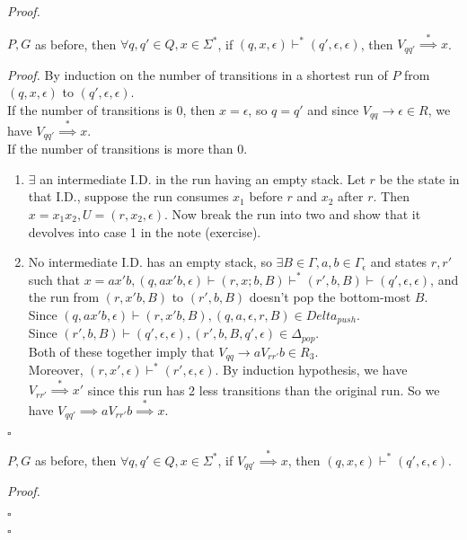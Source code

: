 \documentclass[a4paper]{article}
\newenvironment{proof}{\begin{breakbox}\textit{Proof.}}{\hfill$\square$\end{breakbox}}
\newcommand{\nl}{\vspace{0.2cm}\\}
\newcommand{\produces}{\implies}
\newcommand{\derives}{\stackrel{*}{\implies}}
\newcommand{\changesto}{\vdash}
\begin{document}
\begin{proof}
    \begin{claim}
        $P, G$ as before, then $\forall q, q' \in Q, x \in \Sigma^*$, if $(q, x, \epsilon) \changesto^* (q', \epsilon, \epsilon)$, then $V_{qq'} \derives x$.
    \end{claim}
    \begin{proof}
        By induction on the number of transitions in a shortest run of $P$ from $(q, x, \epsilon)$ to $(q', \epsilon, \epsilon)$.\nl
        If the number of transitions is $0$, then $x = \epsilon$, so $q = q'$ and since $V_{qq} \to \epsilon \in R$, we have $V_{qq'} \derives x$.\nl
        If the number of transitions is more than 0.
        \begin{enumerate}
            \item $\exists$ an intermediate I.D. in the run having an empty stack. Let $r$ be the state in that I.D., suppose the run consumes $x_1$ before $r$ and $x_2$ after $r$.
                Then $x = x_1x_2, U = (r, x_2, \epsilon)$. Now break the run into two and show that it devolves into case 1 in the note (exercise).
            \item No intermediate I.D. has an empty stack, so $\exists B \in \Gamma, a, b \in \Gamma_\epsilon$ and states $r, r'$ such that $x = ax'b, (q, ax'b, \epsilon) \changesto (r, x;b, B)
                \changesto^* (r', b, B) \changesto (q', \epsilon, \epsilon)$, and the run from $(r, x'b, B)$ to $(r', b, B)$ doesn't pop the bottom-most $B$.\nl
                Since $(q, ax'b, \epsilon) \changesto (r, x'b, B), (q, a, \epsilon, r, B) \in Delta_{push}$.\nl
                Since $(r', b, B) \changesto (q', \epsilon, \epsilon), (r', b, B, q', \epsilon) \in \Delta_{pop}$.\nl
                Both of these together imply that $V_{qq} \to aV_{rr'}b \in R_3$.\nl
                Moreover, $(r, x', \epsilon) \changesto^* (r', \epsilon, \epsilon)$.
                By induction hypothesis, we have $V_{rr'} \derives x'$ since this run has 2 less transitions than the original run.
                So we have $V_{qq'} \produces aV_{rr'}b \derives x$.
        \end{enumerate}
    \end{proof}
    \begin{claim}
        $P, G$ as before, then $\forall q, q' \in Q, x \in \Sigma^*$, if $V_{qq'} \derives x$, then $(q, x, \epsilon) \changesto^* (q', \epsilon, \epsilon)$.
    \end{claim}
    \begin{proof}

\end{proof}
\end{proof}
\end{document}
